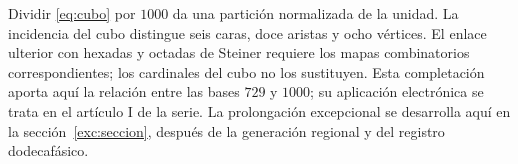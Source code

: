 Dividir \eqref{eq:cubo} por \(1000\) da una partición normalizada de la unidad. La incidencia del cubo distingue seis caras, doce aristas y ocho vértices. El enlace ulterior con hexadas y octadas de Steiner requiere los mapas combinatorios correspondientes; los cardinales del cubo no los sustituyen. Esta completación aporta aquí la relación entre las bases \(729\) y \(1000\); su aplicación electrónica se trata en el artículo I de la serie. La prolongación excepcional se desarrolla aquí en la sección~\ref{exc:seccion}, después de la generación regional y del registro dodecafásico.





